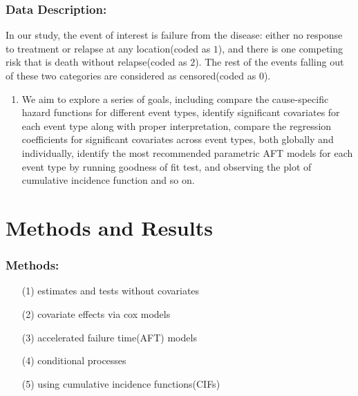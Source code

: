 \documentclass{beamer}[10]
\begin{document}
\begin{frame}
	\frametitle{Data Description:}
	In our study, the event of interest is failure from the disease: either no response to treatment or relapse at any location(coded as $1$), and there is one competing risk that is death without relapse(coded as $2$). The rest of the events falling out of these two categories are considered as censored(coded as $0$).
	\begin{enumerate}
		\item We aim to explore a series of goals, including compare the cause-specific hazard functions for different event types, identify significant covariates for each event type along with proper interpretation, compare the regression coefficients for significant covariates across event types, both globally and individually, identify the most recommended parametric AFT models for each event type by running goodness of fit test, and observing the plot of cumulative incidence function and so on.
	\end{enumerate}
\end{frame}
\section{Methods and Results}
\begin{frame}
	\frametitle{Methods:}
	\begin{enumerate}
		\item[(1)] estimates and tests without covariates 
	\item[(2)] covariate effects via cox models
	\item[(3)] accelerated failure time(AFT) models
	\item[(4)]conditional processes
	\item[(5)] using cumulative incidence functions(CIFs)
	\end{enumerate}
\end{frame}
\end{document}
